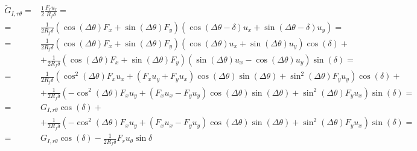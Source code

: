 \documentclass[a4paper]{jpconf}
\begin{document}
\begin{equation}
\begin{split}
\widetilde{G}_{I,r\theta} = &\frac{1}{2}\frac{F_{r}u_{r}}{R_{f}\delta}=\\
= &\frac{1}{2R_{f}\delta}\left(\cos\left(\Delta\theta\right) F_{x}+\sin\left(\Delta\theta\right)F_{y}\right)\left(\cos\left(\Delta\theta-\delta\right) u_{x}+\sin\left(\Delta\theta-\delta\right) u_{y}\right)=\\
= &\frac{1}{2R_{f}\delta}\left(\cos\left(\Delta\theta\right) F_{x}+\sin\left(\Delta\theta\right)F_{y}\right)\left(\cos\left(\Delta\theta\right) u_{x}+\sin\left(\Delta\theta\right) u_{y}\right)\cos\left(\delta\right)+\\
&+\frac{1}{2R_{f}\delta}\left(\cos\left(\Delta\theta\right) F_{x}+\sin\left(\Delta\theta\right)F_{y}\right)\left(\sin\left(\Delta\theta\right) u_{x}-\cos\left(\Delta\theta\right) u_{y}\right)\sin\left(\delta\right)=\\
= &\frac{1}{2R_{f}\delta}\left(\cos^{2}\left(\Delta\theta\right) F_{x}u_{x}+\left(F_{x}u_{y}+F_{y}u_{x}\right)\cos\left(\Delta\theta\right)\sin\left(\Delta\theta\right)+\sin^{2}\left(\Delta\theta\right)F_{y}u_{y}\right)\cos\left(\delta\right)+\\
&+\frac{1}{2R_{f}\delta}\left(-\cos^{2}\left(\Delta\theta\right) F_{x}u_{y}+\left(F_{x}u_{x}-F_{y}u_{y}\right)\cos\left(\Delta\theta\right)\sin\left(\Delta\theta\right)+\sin^{2}\left(\Delta\theta\right)F_{y}u_{x}\right)\sin\left(\delta\right)=\\
= &G_{I,r\theta}\cos\left(\delta\right)+\\
&+\frac{1}{2R_{f}\delta}\left(-\cos^{2}\left(\Delta\theta\right) F_{x}u_{y}+\left(F_{x}u_{x}-F_{y}u_{y}\right)\cos\left(\Delta\theta\right)\sin\left(\Delta\theta\right)+\sin^{2}\left(\Delta\theta\right)F_{y}u_{x}\right)\sin\left(\delta\right)=\\
= &G_{I,r\theta}\cos\left(\delta\right)-\frac{1}{2R_{f}\delta}F_{r}u_{\theta}\sin{\delta}\\
\end{split}
\end{equation}
\end{document}
